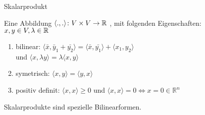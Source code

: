 \documentclass[class=article, crop=false]{standalone}
\begin{document}
\begin{zettel}{Skalarprodukt}
\begin{flashcard}[]{}
	\begin{definition}[Skalarprodukt]
		Eine Abbildung $ \langle .,.\rangle \colon V \times V\to \mathbb{R} $ , mit folgenden Eigenschaften:\\
		$x,y \in  V, \lambda \in  \mathbb{R} $
		\begin{enumerate}
			\item bilinear: $ \langle \bar{x},\bar{y}_1+\bar{y_2}\rangle  = \langle \bar{x},\bar{y_1}\rangle + \langle x_1,y_2\rangle $\\
			      und $ \langle x,\lambda y \rangle = \lambda \langle x,y\rangle $
			\item symetrisch: $ \langle x,y\rangle = \langle y,x\rangle $
			\item positiv definit: $ \langle x,x\rangle \geq 0 $ und $ \langle x,x\rangle  = 0 \iff  x = 0 \in  \mathbb{R}^n$
		\end{enumerate}
	\end{definition}
\end{flashcard}
\begin{remark}
	Skalarprodukte sind spezielle Bilinearformen.
\end{remark}
\end{zettel}
\end{document}
